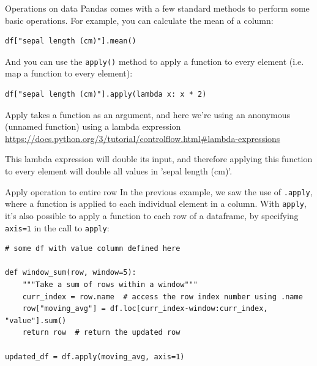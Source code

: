 \documentclass[10pt]{beamer}
\begin{document}
\begin{frame}[label={sec:org3299fc7},fragile]{Operations on data}
 Pandas comes with a few standard methods to perform some basic operations. For
example, you can calculate the mean of a column:

\begin{verbatim}
df["sepal length (cm)"].mean()
\end{verbatim}

And you can use the \texttt{apply()} method to apply a function to every element
(i.e. map a function to every element):

\begin{verbatim}
df["sepal length (cm)"].apply(lambda x: x * 2)
\end{verbatim}

Apply takes a function as an argument, and here we're using an anonymous
(unnamed function) using a lambda expression
\url{https://docs.python.org/3/tutorial/controlflow.html\#lambda-expressions}

This lambda expression will double its input, and therefore applying this
function to every element will double all values in 'sepal length (cm)'.
\end{frame}

\begin{frame}[label={sec:orgfdb8135},fragile]{Apply operation to entire row}
 In the previous example, we saw the use of \texttt{.apply}, where a function is
applied to each individual element in a column. With \texttt{apply}, it's also
possible to apply a function to each row of a dataframe, by specifying
\texttt{axis=1} in the call to \texttt{apply}:

\begin{verbatim}
# some df with value column defined here

def window_sum(row, window=5):
    """Take a sum of rows within a window"""
    curr_index = row.name  # access the row index number using .name
    row["moving_avg"] = df.loc[curr_index-window:curr_index, "value"].sum()
    return row  # return the updated row

updated_df = df.apply(moving_avg, axis=1)
\end{verbatim}
\end{frame}
\end{document}
